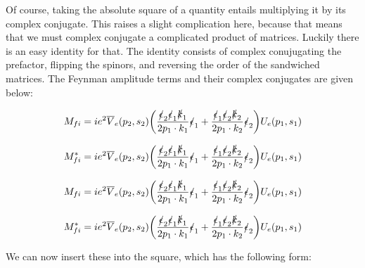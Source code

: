 \documentclass[a4]{article}
\begin{document}
    Of course, taking the absolute square of a quantity entails multiplying it by its complex conjugate. This raises a slight complication here, because that means that we must complex conjugate a complicated product of matrices. Luckily there is an easy identity for that. The identity
    consists of complex conujugating the prefactor, flipping the spinors, and reversing the order of the sandwiched matrices. The Feynman amplitude terms and their complex conjugates are given below:

    \begin{equation}
        M_{fi} = i e^2 \overline{V}_e (p_2, s_2) \bigg( \frac{\slashed{\epsilon}_2 \slashed{\epsilon}_1 \slashed{k}_1}{2 p_1 \cdot k_1} \slashed{\epsilon}_1  + \frac{\slashed{\epsilon}_1 \slashed{\epsilon}_2 \slashed{k}_2}{2 p_1 \cdot k_2} \slashed{\epsilon}_2 \bigg) U_e (p_1, s_1)
    \end{equation}

    \begin{framed}
        \begin{equation}
            M_{fi}^* = i e^2 \overline{V}_e (p_2, s_2) \bigg( \frac{\slashed{\epsilon}_2 \slashed{\epsilon}_1 \slashed{k}_1}{2 p_1 \cdot k_1} \slashed{\epsilon}_1  + \frac{\slashed{\epsilon}_1 \slashed{\epsilon}_2 \slashed{k}_2}{2 p_1 \cdot k_2} \slashed{\epsilon}_2 \bigg) U_e (p_1, s_1)
        \end{equation}
    \end{framed}

    \begin{equation}
        M_{fi} = i e^2 \overline{V}_e (p_2, s_2) \bigg( \frac{\slashed{\epsilon}_2 \slashed{\epsilon}_1 \slashed{k}_1}{2 p_1 \cdot k_1} \slashed{\epsilon}_1  + \frac{\slashed{\epsilon}_1 \slashed{\epsilon}_2 \slashed{k}_2}{2 p_1 \cdot k_2} \slashed{\epsilon}_2 \bigg) U_e (p_1, s_1)
    \end{equation}

    \begin{framed}
        \begin{equation}
            M_{fi}^* = i e^2 \overline{V}_e (p_2, s_2) \bigg( \frac{\slashed{\epsilon}_2 \slashed{\epsilon}_1 \slashed{k}_1}{2 p_1 \cdot k_1} \slashed{\epsilon}_1  + \frac{\slashed{\epsilon}_1 \slashed{\epsilon}_2 \slashed{k}_2}{2 p_1 \cdot k_2} \slashed{\epsilon}_2 \bigg) U_e (p_1, s_1)
        \end{equation}
    \end{framed}

    We can now insert these into the square, which has the following form:
\end{document}
